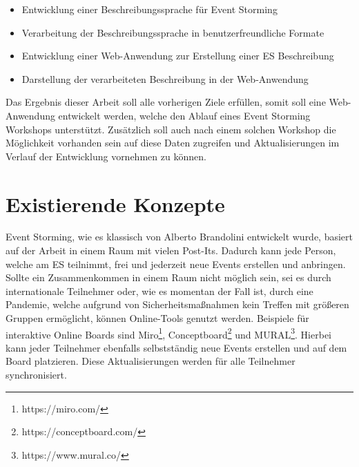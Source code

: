 \begin{itemize}
    \item Entwicklung einer Beschreibungssprache für Event Storming
    \item Verarbeitung der Beschreibungssprache in benutzerfreundliche Formate
    \item Entwicklung einer Web-Anwendung zur Erstellung einer \ac{ES} Beschreibung
    \item Darstellung der verarbeiteten Beschreibung in der Web-Anwendung
\end{itemize}

Das Ergebnis dieser Arbeit soll alle vorherigen Ziele erfüllen, somit soll eine Web-Anwendung entwickelt werden,
welche den Ablauf eines Event Storming Workshops unterstützt.
Zusätzlich soll auch nach einem solchen Workshop die Möglichkeit vorhanden sein auf diese Daten zugreifen und Aktualisierungen
im Verlauf der Entwicklung vornehmen zu können.


\section{Existierende Konzepte}\label{sec:existierende-konzepte}
Event Storming, wie es klassisch von Alberto Brandolini entwickelt wurde, basiert auf der Arbeit in einem Raum mit vielen Post-Its.
Dadurch kann jede Person, welche am \ac{ES} teilnimmt, frei und jederzeit neue Events erstellen und anbringen.
Sollte ein Zusammenkommen in einem Raum nicht möglich sein, sei es durch internationale Teilnehmer oder, wie es momentan der Fall ist,
durch eine Pandemie, welche aufgrund von Sicherheitsmaßnahmen kein Treffen mit größeren Gruppen ermöglicht, können Online-Tools genutzt werden.
Beispiele für interaktive Online Boards sind Miro\footnote{https://miro.com/}, Conceptboard\footnote{https://conceptboard.com/} und MURAL\footnote{https://www.mural.co/}.
Hierbei kann jeder Teilnehmer ebenfalls selbstständig neue Events erstellen und auf dem Board platzieren.
Diese Aktualisierungen werden für alle Teilnehmer synchronisiert.


